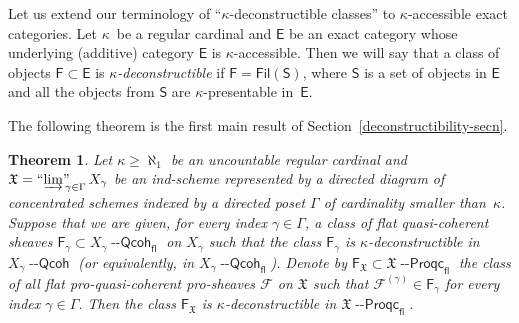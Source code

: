 \documentclass[12pt,a4paper]{amsart}
\newcommand{\+}{\protect\nobreakdash-}
\renewcommand{\:}{\colon}
\newcommand{\Qcoh}{{\operatorname{\mathsf{--Qcoh}}}}
\newcommand{\Proqc}{{\operatorname{\mathsf{--Proqc}}}}
\newcommand{\fl}{\mathsf{fl}}
\newcommand{\Fil}{\mathsf{Fil}}
\newcommand{\ilim}
 {\mathop{\text{\normalfont``$\varinjlim$''\!\!}}\nolimits}
\newcommand{\sE}{\mathsf E}
\newcommand{\sF}{\mathsf F}
\newcommand{\sS}{\mathsf S}
\newcommand{\fX}{\mathfrak X}
\newcommand{\rF}{\mathscr F}
\theoremstyle{plain}
\newtheorem{thm}{Theorem}[section]
\theoremstyle{definition}
\begin{document}
 Let us extend our terminology of ``$\kappa$\+deconstructible
classes'' to $\kappa$\+accessible exact categories.
 Let $\kappa$~be a regular cardinal and $\sE$ be an exact category
whose underlying (additive) category $\sE$ is $\kappa$\+accessible.
 Then we will say that a class of objects $\sF\subset\sE$ is
\emph{$\kappa$\+deconstructible} if $\sF=\Fil(\sS)$, where $\sS$
is a set of objects in $\sE$ and all the objects from $\sS$ are
$\kappa$\+presentable in\/~$\sE$.

 The following theorem is the first main result of
Section~\ref{deconstructibility-secn}.

\begin{thm} \label{deconstrbty-for-proqcoh-prosheaves}
 Let\/ $\kappa\ge\aleph_1$ be an uncountable regular cardinal and\/
$\fX=\ilim_{\gamma\in\Gamma}X_\gamma$ be an ind-scheme represented
by a directed diagram of concentrated schemes indexed by a directed
poset\/ $\Gamma$ of cardinality smaller than\/~$\kappa$.
 Suppose that we are given, for every index\/ $\gamma\in\Gamma$,
a class of flat quasi-coherent sheaves $\sF_\gamma\subset
X_\gamma\Qcoh_\fl$ on $X_\gamma$ such that the class\/ $\sF_\gamma$
is\/ $\kappa$\+deconstructible in $X_\gamma\Qcoh$ (or equivalently,
in $X_\gamma\Qcoh_\fl$).
 Denote by\/ $\sF_\fX\subset\fX\Proqc_\fl$ the class of all
flat pro-quasi-coherent pro-sheaves\/ $\rF$ on\/ $\fX$ such that\/
$\rF^{(\gamma)}\in\sF_\gamma$ for every index\/ $\gamma\in\Gamma$.
 Then the class\/ $\sF_\fX$ is $\kappa$\+deconstructible in\/
$\fX\Proqc_\fl$.
\end{thm}
\end{document}
